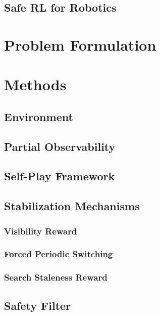 \documentclass[letterpaper, 10 pt, conference]{ieeeconf}
\begin{document}
\subsection{Safe RL for Robotics}

\section{Problem Formulation}
\label{sec:problem}

\section{Methods}
\label{sec:methods}

\subsection{Environment}

\subsection{Partial Observability}

\subsection{Self-Play Framework}

\subsection{Stabilization Mechanisms}

\subsubsection{Visibility Reward}

\subsubsection{Forced Periodic Switching}

\subsubsection{Search Staleness Reward}

\subsection{Safety Filter}
\end{document}
